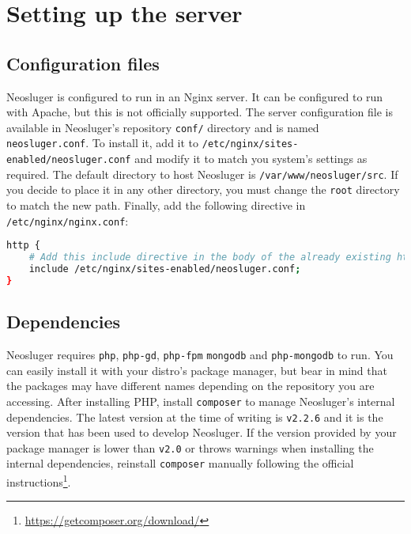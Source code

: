 \chapter{Setting up the server}\label{setting-up-the-server}

\section{Configuration files}\label{configuration-files}

Neosluger is configured to run in an Nginx server.
It can be configured to run with Apache, but this is not officially supported.
The server configuration file is available in Neosluger's repository \texttt{conf/} directory and is named \texttt{neosluger.conf}.
To install it, add it to \texttt{/etc/nginx/sites-enabled/neosluger.conf} and modify it to match you system's settings as required.
The default directory to host Neosluger is \texttt{/var/www/neosluger/src}.
If you decide to place it in any other directory, you must change the \texttt{root} directory to match the new path.
Finally, add the following directive in \texttt{/etc/nginx/nginx.conf}:

\begin{lstlisting}[language=sh]
http {
	# Add this include directive in the body of the already existing http block:
	include /etc/nginx/sites-enabled/neosluger.conf;
}
\end{lstlisting}


\section{Dependencies}\label{dependencies}

Neosluger requires \texttt{php}, \texttt{php-gd}, \texttt{php-fpm} \texttt{mongodb} and \texttt{php-mongodb} to run.
You can easily install it with your distro's package manager, but bear in mind that the packages may have different names depending on the repository you are accessing.
After installing PHP, install \texttt{composer} to manage Neosluger's internal dependencies.
The latest version at the time of writing is \texttt{v2.2.6} and it is the version that has been used to develop Neosluger.
If the version provided by your package manager is lower than \texttt{v2.0} or throws warnings when installing the internal dependencies, reinstall \texttt{composer} manually following the official instructions\footnote{
	\url{https://getcomposer.org/download/}
}.

